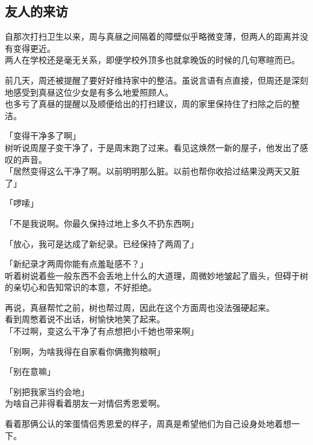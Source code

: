 \subsection{友人的来访}

自那次打扫卫生以来，周与真昼之间隔着的障壁似乎略微变薄，但两人的距离并没有变得更近。\\

两人在学校还是毫无关系，即便学校外顶多也就拿晚饭的时候的几句寒暄而已。

前几天，周还被提醒了要好好维持家中的整洁。虽说言语有点直接，但周还是深刻地感受到真昼这位少女是有多么地爱照顾人。\\

也多亏了真昼的提醒以及顺便给出的打扫建议，周的家里保持住了扫除之后的整洁。\\

\vspace{2\baselineskip}

「变得干净多了啊」\\

树听说周屋子变干净了，于是周末跑了过来。看见这焕然一新的屋子，他发出了感叹的声音。\\

「居然变得这么干净了啊。以前明明那么脏。以前也帮你收拾过结果没两天又脏了」

「啰嗦」

「不是我说啊。你最久保持过地上多久不扔东西啊」

「放心，我可是达成了新纪录。已经保持了两周了」

「新纪录才两周你能有点羞耻感不？」\\

听着树说着些一般东西不会丢地上什么的大道理，周微妙地皱起了眉头，但碍于树的亲切心和告知常识的本意，不好拒绝。

再说，真昼帮忙之前，树也帮过周，因此在这个方面周也没法强硬起来。\\

看到周憋着说不出话，树愉快地笑了起来。\\

「不过啊，变这么干净了有点想把小千她也带来啊」

「别啊，为啥我得在自家看你俩撒狗粮啊」

「别在意嘛」

「别把我家当约会地」\\

为啥自己非得看着朋友一对情侣秀恩爱啊。

看着那俩公认的笨蛋情侣秀恩爱的样子，周真是希望他们为自己设身处地着想一下。\\


